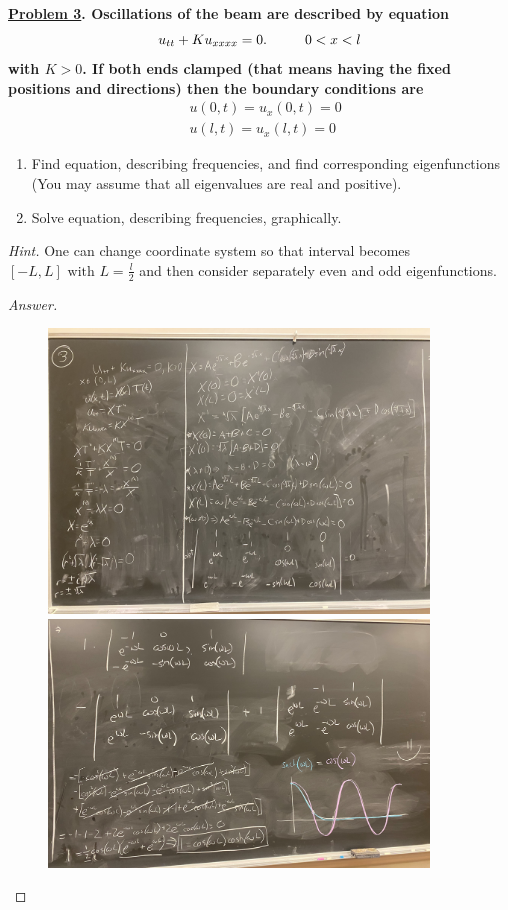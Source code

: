 \documentclass{article}
\theoremstyle{definition}
\renewcommand\qedsymbol{$\blacksquare$}
\newenvironment{ans}{\begin{proof}[Answer]\renewcommand{\qedsymbol}{}}{\end{proof}}
\newenvironment{boldenv}{\bfseries\boldmath}{}
\begin{document}
\begin{boldenv}
    \underline{Problem 3}. Oscillations of the beam are described by equation
    \[ u_{tt} + Ku_{xxxx} = 0. \mkern 50mu 0<x<l \]
    with $K > 0$.
    If both ends clamped (that means having the fixed positions and directions) then the boundary conditions are \begin{align*}
        &u(0,t) = u_x(0,t)=0\\
        &u(l,t) = u_x(l,t)=0
    \end{align*} \begin{enumerate}
        \item Find equation, describing frequencies, and find corresponding eigenfunctions (You may assume that all eigenvalues are real and positive).

        \item Solve equation, describing frequencies, graphically.
    \end{enumerate}
    \textit{Hint.} One can change coordinate system so that interval becomes $[-L, L] \text{ with } L = \frac{l}{2}$ and then consider separately even and odd eigenfunctions.
\end{boldenv}
\begin{ans} \phantom{.}
    \begin{figure}[H]
        \centering
        \includegraphics[width=0.9\textwidth]{Problem 3.jpg}
        \includegraphics[width=0.9\textwidth]{Problem 3 (2).jpg}
    \end{figure}
\end{ans}
\end{document}
